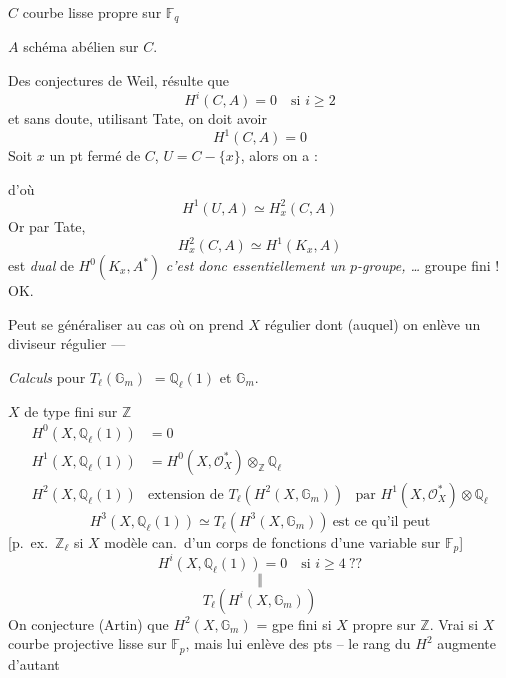 \documentclass[11pt,a4paper]{article}
\begin{document}
$C$ courbe lisse propre sur $\mathbb{F}_{q}$

$A$ schéma abélien sur $C$.

Des conjectures de Weil, résulte que
\[
  H^{i}(C, A) = 0 \quad \text{si } i \geqslant 2
\]
et sans doute, utilisant Tate, on doit avoir
\[
  H^{1}(C, A) = 0
\]
Soit $x$ un pt fermé de $C$, $U = C - \{x\}$, alors on a :


d'où
\[
  H^{1}(U, A) \simeq H^{2}_{x}(C, A)
\]
Or par Tate,
\[
  H^{2}_{x}(C, A) \simeq H^{1}(K_{x}, A)
\]
est \emph{dual} de $H^{0}(K_{x}, A^{*})$
\emph{c'est donc essentiellement un $p$-groupe, \ldots} groupe fini ! OK.

Peut se généraliser au cas où on prend $X$ régulier dont (auquel) on enlève un
diviseur régulier ---

\emph{Calculs} pour $T_{\ell}(\mathbb{G}_{m})$ $= \mathbb{Q}_{\ell}(1)$
et $\mathbb{G}_{m}$.

$X$ de type fini sur $\mathbb{Z}$
\[
\begin{array}{lll}
  H^{0}(X, \mathbb{Q}_{\ell}(1)) & = 0 & \\[1ex]
  H^{1}(X, \mathbb{Q}_{\ell}(1)) & = H^{0}(X, \mathcal{O}_{X}^{*}) \otimes_{\mathbb{Z}} \mathbb{Q}_{\ell} & \\[1ex]
  H^{2}(X, \mathbb{Q}_{\ell}(1)) & \text{extension de } T_{\ell}(H^{2}(X, \mathbb{G}_{m})) & \text{par } H^{1}(X, \mathcal{O}_{X}^{*}) \otimes \mathbb{Q}_{\ell}
\end{array}
\]
\[
  H^{3}(X, \mathbb{Q}_{\ell}(1)) \simeq T_{\ell}(H^{3}(X, \mathbb{G}_{m}))
  \ \text{est ce qu'il peut}
\]
[p.\ ex.\ $\mathbb{Z}_{\ell}$ si $X$ modèle can.\ d'un corps de
fonctions d'une variable sur $\mathbb{F}_{p}$]
\[
  H^{i}(X, \mathbb{Q}_{\ell}(1)) = 0 \quad \text{si } i \geqslant 4 \ ??
\]
\[
  \Vert
\]
\[
  T_{\ell}(H^{i}(X, \mathbb{G}_{m}))
\]
On conjecture (Artin) que $H^{2}(X, \mathbb{G}_{m})$ = gpe fini si $X$
propre sur $\mathbb{Z}$.  Vrai si $X$ courbe projective lisse
sur $\mathbb{F}_{p}$, mais  lui enlève des pts -- le
rang du $H^{2}$ augmente d'autant
\end{document}
